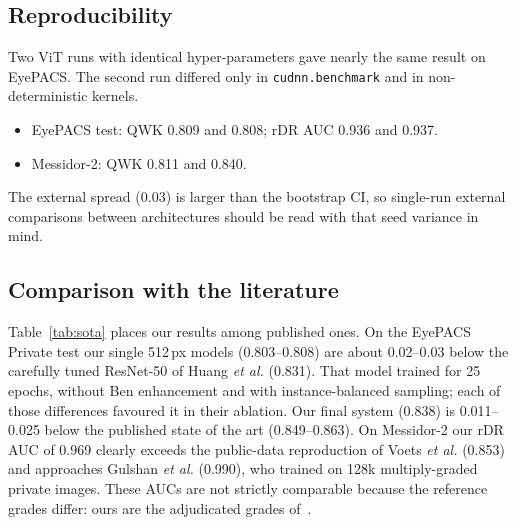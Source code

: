 \documentclass[conference,a4paper]{IEEEtran}
\begin{document}
\subsection{Reproducibility}
Two ViT runs with identical hyper-parameters gave nearly the same result on EyePACS.
The second run differed only in \texttt{cudnn.benchmark} and in non-deterministic kernels.
\begin{itemize}
\item EyePACS test: QWK 0.809 and 0.808; rDR AUC 0.936 and 0.937.
\item Messidor-2: QWK 0.811 and 0.840.
\end{itemize}
The external spread (0.03) is larger than the bootstrap CI, so single-run external comparisons between architectures should be read with that seed variance in mind.

\subsection{Comparison with the literature}
Table~\ref{tab:sota} places our results among published ones.
On the EyePACS Private test our single 512\,px models (0.803--0.808) are about 0.02--0.03 below the carefully tuned ResNet-50 of Huang \emph{et al.} (0.831). That model trained for 25 epochs, without Ben enhancement and with instance-balanced sampling; each of those differences favoured it in their ablation.
Our final system (0.838) is 0.011--0.025 below the published state of the art (0.849--0.863).
On Messidor-2 our rDR AUC of 0.969 clearly exceeds the public-data reproduction of Voets \emph{et al.} (0.853) and approaches Gulshan \emph{et al.} (0.990), who trained on 128k multiply-graded private images.
These AUCs are not strictly comparable because the reference grades differ: ours are the adjudicated grades of~\cite{krause}.
\end{document}
